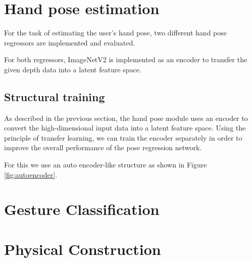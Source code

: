 \section{Hand pose estimation}
For the task of estimating the user's hand pose, two different hand pose regressors are implemented and evaluated.

For both regressors, ImageNetV2 \cite{Sandler} is implemented as an encoder to transfer the given depth data into a latent feature space. 

\subsection{Structural training}
As described in the previous section, the hand pose module uses an encoder to convert the high-dimensional input data into a latent feature space. 
Using the principle of transfer learning, we can train the encoder separately in order to improve the overall performance of the pose regression network. 

For this we use an auto encoder-like structure as shown in Figure \ref{fig:autoencoder}.


\section{Gesture Classification}
\section{Physical Construction}

